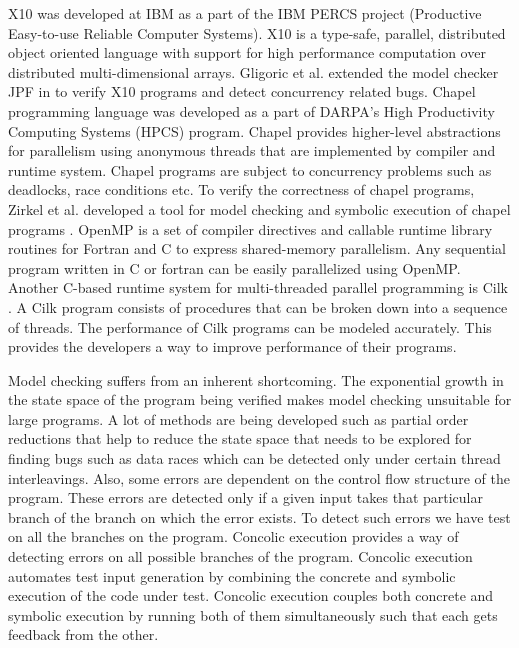 X10 \cite{charles2005x10} was developed at IBM as a part of the IBM PERCS project (Productive Easy-to-use Reliable Computer Systems). X10 is a type-safe, parallel, distributed object oriented language with support for high performance computation over distributed multi-dimensional arrays. Gligoric et al. extended the model checker JPF in \cite{gligoric2012x10x} to verify X10 programs and detect concurrency related bugs. Chapel programming language \cite{chamberlain2007parallel} was developed as a part of DARPA's High Productivity Computing Systems (HPCS) program. Chapel provides higher-level abstractions for parallelism using anonymous threads that are implemented by compiler and runtime system. Chapel programs are subject to concurrency problems such as deadlocks, race conditions etc. To verify the correctness of chapel programs, Zirkel et al. developed a tool for model checking and symbolic execution of chapel programs \cite{zirkel2013automated}. OpenMP \cite{dagum1998openmp} is a set of compiler directives and callable runtime library routines for Fortran and C to express shared-memory parallelism. Any sequential program written in C or fortran can be easily parallelized using OpenMP. Another C-based runtime system for multi-threaded parallel programming is Cilk \cite{blumofe1996cilk}. A Cilk program consists of procedures that can be broken down into a sequence of threads. The performance of Cilk programs can be modeled accurately. This provides the developers a way to improve performance of their programs.

Model checking suffers from an inherent shortcoming. The exponential growth in the state space of the program being verified makes model checking unsuitable for large programs. A lot of methods are being developed such as partial order reductions that help to reduce the state space that needs to be explored for finding bugs such as data races which can be detected only under certain thread interleavings. Also, some errors are dependent on the control flow structure of the program. These errors are detected only if a given input takes that particular branch of the branch on which the error exists. To detect such errors we have test on all the branches on the program. Concolic execution provides a way of detecting errors on all possible branches of the program. Concolic execution automates test input generation by combining the concrete and symbolic execution of the code under test. Concolic execution couples both concrete and symbolic execution by running both of them simultaneously such that each gets feedback from the other.

